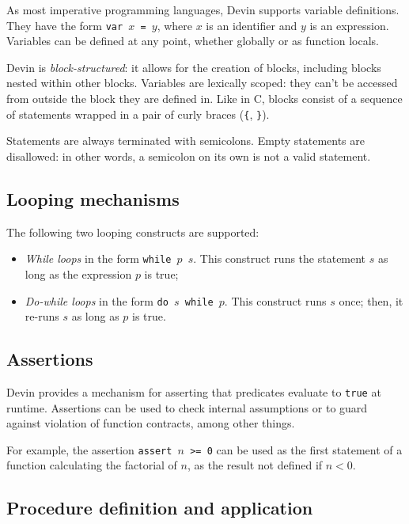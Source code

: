 \documentclass[11pt, american, draft]{PhdThesis}
\begin{document}
  As most imperative programming languages, Devin supports variable definitions. They have the form
  \mbox{\texttt{var $x$ = $y$}}, where $x$ is an identifier and $y$ is an expression. Variables can
  be defined at any point, whether globally or as function locals.

  Devin is \emph{block-structured}: it allows for the creation of blocks, including blocks nested
  within other blocks. Variables are lexically scoped: they can't be accessed from outside the block
  they are defined in. Like in C, blocks consist of a sequence of statements wrapped in a pair of
  curly braces (\verb${$, \verb$}$).

  Statements are always terminated with semicolons. Empty statements are disallowed: in other words,
  a semicolon on its own is not a valid statement.

  \subsection{Looping mechanisms}

  The following two looping constructs are supported:

  \begin{itemize}[noitemsep,topsep=0pt]
    \item \emph{While loops} in the form \mbox{\texttt{while $p$ $s$}}. This construct runs the
    statement $s$ as long as the expression $p$ is true;

    \item \emph{Do-while loops} in the form \mbox{\texttt{do $s$ while $p$}}. This construct runs
    $s$ once; then, it re-runs $s$ as long as $p$ is true.
  \end{itemize}

  \subsection{Assertions}

  Devin provides a mechanism for asserting that predicates evaluate to \verb$true$ at runtime.
  Assertions can be used to check internal assumptions or to guard against violation of function
  contracts, among other things.

  For example, the assertion  \mbox{\texttt{assert $n$ >= 0}} can be used as the first statement of
  a function calculating the factorial of $n$, as the result not defined if \mbox{$n < 0$}.

  \subsection{Procedure definition and application}
\end{document}
